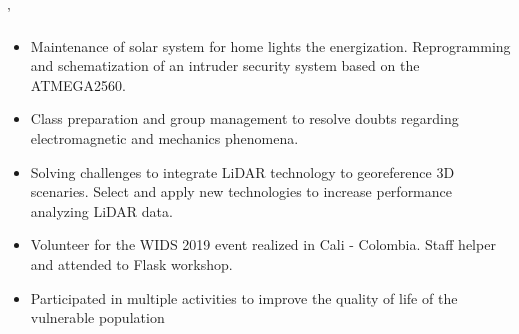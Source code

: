 \documentclass[paper=a4,fontsize=10pt,ragged2e,withhyper]{altacv}%
\begin{document}
%
\normalsize%

\sloppy%
'


\makecvheader%

%
\begin{paracol}{2}%
\begin{itemize}
 \item Maintenance of solar system for home lights the energization.\newline%
Reprogramming and schematization of an intruder security system based on the ATMEGA2560. 
\end{itemize}
\divider
{}
\begin{itemize}
 \item Class preparation and group management to resolve doubts regarding electromagnetic and mechanics phenomena. 
\end{itemize}
\divider
{}
\begin{itemize}
 \item Solving challenges to integrate LiDAR technology to georeference 3D scenaries.\newline%
Select and apply new technologies to increase performance analyzing LiDAR data. 
\end{itemize}
\divider
{}
\divider
{}
\divider
{}
\divider
{}
\begin{itemize}
 \item Volunteer for the WIDS 2019 event realized in Cali {-} Colombia.\newline%
Staff helper and attended to Flask workshop. 
\end{itemize}
\divider
{}
\begin{itemize}
 \item Participated in multiple activities to improve the quality of life of the vulnerable population 
\end{itemize}

\end{paracol}
\end{document}
